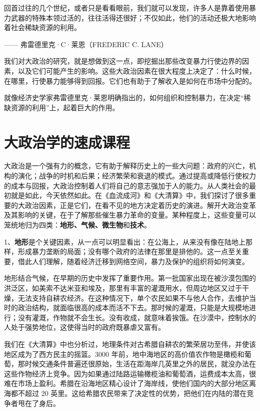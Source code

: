 \begin{tcolorbox}
回首过往的几个世纪，或者只是看看眼前，我们就可以发现，许多人是靠着使用暴力武器的特殊本领过活的，往往活得还很好；不仅如此，他们的活动还极大地影响着社会稀缺资源的利用。
\begin{flushright}
—— 弗雷德里克·C·莱恩（FREDERIC C. LANE） 
\end{flushright}
\end{tcolorbox}

我们对大政治的研究，就是想做到这一点，即挖掘出那些改变暴力行使边界的因素，以及它们可能产生的影响。这些大政治因素在很大程度上决定了：什么时候，在哪里，行使暴力能够得到回报。它们也有助于了解收入是如何在市场中分配的。

就像经济史学家弗雷德里克·莱恩明确指出的，如何组织和控制暴力，在决定“稀缺资源的利用”上，起着巨大的作用。

\section{大政治学的速成课程}
大政治是一个强有力的概念，它有助于解释历史上的一些大问题：政府的兴亡，机构的演化；战争的时机和后果；经济繁荣和衰退的模式。通过提高或降低行使权力的成本与回报，大政治控制着人们将自己的意志强加于人的能力。从人类社会的最初就是如此，今天依然如此。在《血流成河》和《大清算》中，我们探讨了很多重要的大政治因素，正是它们，在看不见的地方决定着历史的演进。解开大政治变革及其影响的关键，在于了解那些催生暴力革命的变量。某种程度上，这些变量可以笼统地归为四类：\textbf{地形、气候、微生物}和\textbf{技术}。

1、\textbf{地形}是个关键因素，从一点可以明显看出：在公海上，从来没有像在陆地上那样，形成暴力垄断的局面；没有哪个政府的法律在那里是排他的。这一点至关重要，借此人们理解，随着经济迁移到网络空间，暴力及保护的组织将如何演变。

地形结合气候，在早期的历史中发挥了重要作用。第一批国家出现在被沙漠包围的洪泛区，如美索不达米亚和埃及，那里有丰富的灌溉用水，但周边地区又过于干燥，无法支持自耕农经济。在这种情况下，单个农民如果不与他人合作，去维护当时的政治结构，就面临很高的成本而活不下去。那时候的灌溉，只能是大规模地进行；没有灌溉，作物就不会生长。没有收成，就意味着挨饿。在沙漠中，控制水的人处于强势地位，这使得当时的政府既暴虐又富有。

我们在《大清算》中也分析过，地理条件对古希腊自耕农的繁荣居功至伟，并使该地区成为了西方民主的摇篮。3000 年前，地中海地区的高价值农作物是橄榄和葡萄，那时候交通条件普遍还很原始，生活在距海岸几英里之外的居民，就没办法在这些作物经济上竞争。因为如果通过陆路运输橄榄油和葡萄酒，运费成本太高，很难在市场上盈利。希腊在沿海地区精心设计了海岸线，使他们国内的大部分地区离海都不超过 20 英里。这给希腊农民带来了决定性的优势，把他们在内陆的潜在竞争者甩在了身后。

